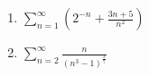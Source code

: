 \documentclass[12pt]{article}
\begin{document}
\begin{enumerate}
\begin{enumerate}
(Hint: When you see something to the $n$th power in a series, it's often a good idea to use the root test.)

\vfill


\item $\displaystyle\sum_{n=1}^\infty \left(2^{-n}+\frac{3n+5}{n^2}\right)$







\vfill

\item $\displaystyle\sum_{n=2}^\infty \frac{n}{(n^3-1)^{\frac{3}{7}}}$
\vfill

\end{enumerate} 

\end{enumerate}
\end{document}
